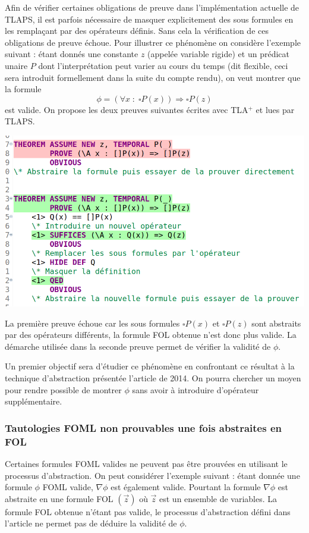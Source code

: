 \documentclass[12pt]{article}
\newcommand{\bpar}[1]{\marginpar{\color{myblue}\footnotesize\raggedright#1}}
\begin{document}
Afin de vérifier certaines obligations de preuve dans l'implémentation actuelle de TLAPS, il est parfois nécessaire de masquer explicitement des sous formules en les remplaçant par des opérateurs définis.
Sans cela la vérification de ces obligations de preuve échoue.
Pour illustrer ce phénomène on considère l'exemple suivant :
étant donnés une constante $z$ (appelée variable rigide) et un prédicat unaire $P$ dont l'interprétation peut varier au cours du temps (dit flexible, ceci sera introduit formellement dans la suite du compte rendu), on veut montrer que la formule
\[ \phi = (\forall x \; : \; \square P(x)) \Rightarrow \square P(z) \]
est valide.
On propose les deux preuves suivantes écrites avec TLA$^+$ et lues par TLAPS.
\begin{center}
  \includegraphics[width=0.8\linewidth]{tlaps_operateur}
\end{center}

La première preuve échoue car les sous formules $\square P(x)$ et $\square P(z)$ sont abstraits par des opérateurs différents, la formule FOL obtenue n'est donc plus valide.
La démarche utilisée dans la seconde preuve permet de vérifier la validité de $\phi$.

Un premier objectif sera d'étudier ce phénomène en confrontant ce résultat à la technique d'abstraction présentée l'article de 2014. On pourra chercher un moyen pour rendre possible de montrer $\phi$ sans avoir à introduire d'opérateur supplémentaire.

\subsubsection{Tautologies FOML non prouvables une fois abstraites en FOL}

Certaines formules FOML valides ne peuvent pas être prouvées en utilisant le processus d'abstraction.
On peut considérer l'exemple suivant :
étant donnée une formule $\phi$ FOML valide, \bpar{écrire $\Box\phi$ ici?} $\nabla \phi$ est également valide.
Pourtant la formule $\nabla \phi$ est abstraite en une formule FOL $(\vec{z})$ où $\vec{z}$ est un ensemble de variables.
La formule FOL obtenue n'étant pas valide, le processus d'abstraction défini dans l'article ne permet pas de déduire la validité de $\phi$.
\end{document}
